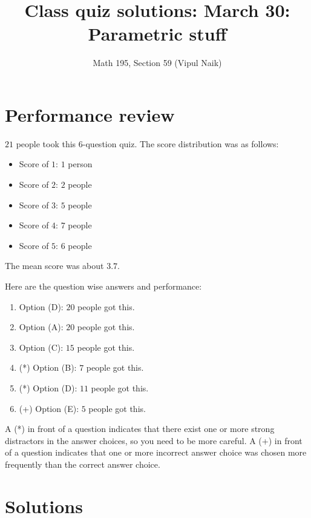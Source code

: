 \documentclass[10pt]{amsart}
\title{Class quiz solutions: March 30: Parametric stuff}
\author{Math 195, Section 59 (Vipul Naik)}
\begin{document}
\maketitle

\section{Performance review}

$21$ people took this $6$-question quiz. The score distribution was as
follows:

\begin{itemize}
\item Score of $1$: $1$ person
\item Score of $2$: $2$ people
\item Score of $3$: $5$ people
\item Score of $4$: $7$ people
\item Score of $5$: $6$ people
\end{itemize}

The mean score was about $3.7$.

Here are the question wise answers and performance:

\begin{enumerate}
\item Option (D): $20$ people got this.
\item Option (A): $20$ people got this.
\item Option (C): $15$ people got this.
\item (*) Option (B): $7$ people got this.
\item (*) Option (D): $11$ people got this.
\item (+) Option (E): $5$ people got this.
\end{enumerate}

A (*) in front of a question indicates that there exist one or more
strong distractors in the answer choices, so you need to be more
careful. A (+) in front of a question indicates that one or more
incorrect answer choice was chosen more frequently than the correct
answer choice.

\section{Solutions}
\end{document}
